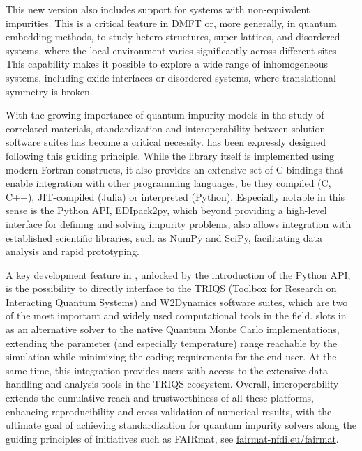 \documentclass[edipack_sp.tex]{subfiles}
\begin{document}
This new version also includes support for systems with non-equivalent impurities. This is a critical feature in DMFT or, more generally, in quantum embedding methods, to study hetero-structures, super-lattices, and disordered systems, where the local environment varies significantly across different sites. This capability makes it 
possible to explore a wide range of inhomogeneous systems, including
oxide interfaces or disordered systems, where
translational symmetry is broken.

With the growing importance of  quantum impurity models in the study of correlated materials,
standardization and interoperability between solution software suites has
become a critical necessity.
\NAME has been expressly designed following this guiding principle. 
While the library itself is implemented using modern Fortran constructs, it also provides an extensive set of C-bindings that enable integration with other programming languages,
be they compiled (C, C++), JIT-compiled (Julia) or interpreted (Python). 
Especially notable in this sense is the Python API, EDIpack2py, which beyond providing a 
high-level interface for defining and solving impurity problems, also allows integration with established scientific libraries, such as NumPy and SciPy, facilitating data analysis and
rapid prototyping.

A key development feature in \NAME, unlocked by the introduction of the Python API, 
is the possibility to directly interface to the TRIQS (Toolbox for Research on Interacting Quantum Systems) and
W2Dynamics software suites, which are two of the most important and widely used computational tools in
the field. \NAME slots in as an alternative solver to the native Quantum Monte Carlo 
implementations, extending the parameter (and especially temperature) range reachable by 
the simulation while minimizing the coding requirements for the end user.
At the same time, this integration provides \NAME users with access to the
extensive data handling and analysis tools in the TRIQS ecosystem. 
Overall, interoperability extends the cumulative reach and trustworthiness of all these platforms,
enhancing reproducibility and cross-validation of numerical results, with the ultimate goal of achieving standardization for quantum impurity solvers along the guiding principles of initiatives such as FAIRmat, see \href{https://www.fairmat-nfdi.eu/fairmat/}{fairmat-nfdi.eu/fairmat}. 
\end{document}
